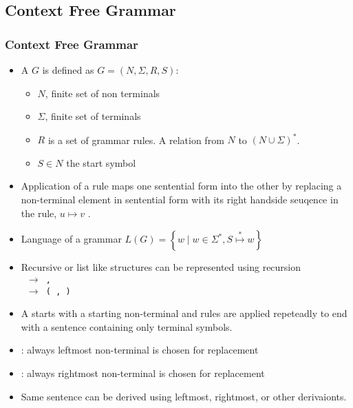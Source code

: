 \subsection{Context Free Grammar}
\begin{frame}
\frametitle{Context Free Grammar}
\begin{itemize}
\item A  $G$ is defined as $G = (N, \Sigma , R, S)$:
\begin{itemize}
\item $N$, finite set of non terminals
\item $\Sigma$, finite set of terminals
\item $R$ is a set of grammar rules. A relation from $N$ to 
	$(N \cup \Sigma)^*$. 
\item $S \in N$ the  start symbol
\end{itemize}
\item Application of a rule maps one sentential form into the other
by replacing a non-terminal element in sentential form with
its right handside seuqence in the rule, $u \mapsto v$ .
\item Language of a grammar $L(G) = \left\{w \mid w \in \Sigma^{*},  S \stackrel{*}{\mapsto} w \right\}$
\end{itemize}
\end{frame}




\begin{frame}
\begin{itemize}
\item Recursive or list like structures can be represented using recursion\\
	\texttt{ $\rightarrow$  , } \\
	\texttt{ $\rightarrow$  (  ,  )}
\item A  starts with a starting non-terminal and rules are applied repeteadly to end with a sentence containing only terminal symbols.
\item {}: always leftmost non-terminal is chosen for replacement
\item {}: always rightmost non-terminal is chosen for replacement
\item Same sentence can be derived using leftmost, rightmost, or other derivaionts.
\end{itemize}
\end{frame}

